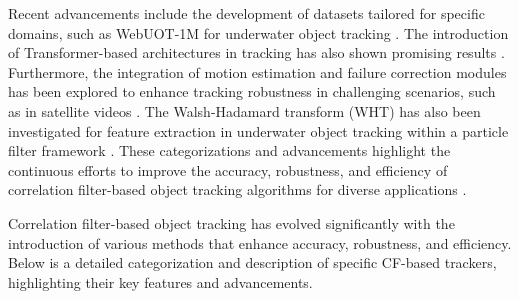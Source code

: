 Recent advancements include the development of datasets tailored for specific domains, such as WebUOT-1M for underwater object tracking \cite{zhang2024webuot}. The introduction of Transformer-based architectures in tracking has also shown promising results \cite{zhang2024webuot}. Furthermore, the integration of motion estimation and failure correction modules has been explored to enhance tracking robustness in challenging scenarios, such as in satellite videos \cite{lin2024motion}. The Walsh-Hadamard transform (WHT) has also been investigated for feature extraction in underwater object tracking within a particle filter framework \cite{rout2019walsh}. These categorizations and advancements highlight the continuous efforts to improve the accuracy, robustness, and efficiency of correlation filter-based object tracking algorithms for diverse applications \cite{feng2019dynamic}\cite{du2021overview}\cite{zhao2020correlation}\cite{lin2024motion}.


Correlation filter-based object tracking has evolved significantly with the introduction of various methods that enhance accuracy, robustness, and efficiency. Below is a detailed categorization and description of specific CF-based trackers, highlighting their key features and advancements.

